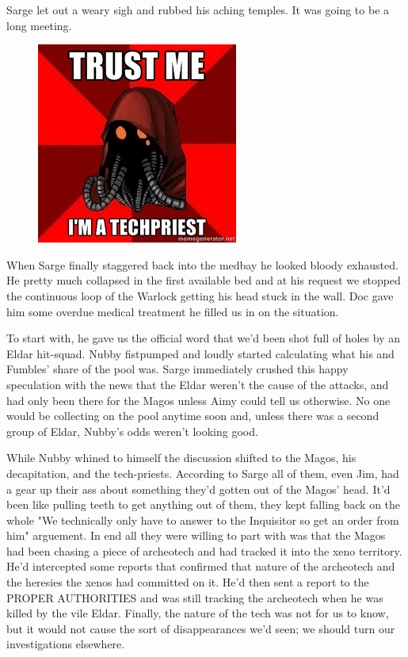 Sarge let out a weary sigh and rubbed his aching temples. 
It was going to be a long meeting.
\begin{figure}
	\begin{center}
		\includegraphics[width=\figwidth]{pics/11/35.png}
	\end{center}
\end{figure}
When Sarge finally staggered back into the medbay he looked bloody exhausted. 
He pretty much collapsed in the first available bed and at his request we stopped the continuous loop of the Warlock getting his head stuck in the wall. 
Doc gave him some overdue medical treatment he filled us in on the situation.

To start with, he gave us the official word that we'd been shot full of holes by an Eldar hit-squad. 
Nubby fistpumped and loudly started calculating what his and Fumbles' share of the pool was. 
Sarge immediately crushed this happy speculation with the news that the Eldar weren't the cause of the attacks, and had only been there for the Magos unless Aimy could tell us otherwise. 
No one would be collecting on the pool anytime soon and, unless there was a second group of Eldar, Nubby's odds weren't looking good.

While Nubby whined to himself the discussion shifted to the Magos, his decapitation, and the tech-priests. 
According to Sarge all of them, even Jim, had a gear up their ass about something they'd gotten out of the Magos' head. 
It'd been like pulling teeth to get anything out of them, they kept falling back on the whole "We technically only have to answer to the Inquisitor so get an order from him" arguement. 
In end all they were willing to part with was that the Magos had been chasing a piece of archeotech and had tracked it into the xeno territory. 
He'd intercepted some reports that confirmed that nature of the archeotech and the heresies the xenos had committed on it. 
He'd then sent a report to the PROPER AUTHORITIES and was still tracking the archeotech when he was killed by the vile Eldar. 
Finally, the nature of the tech was not for us to know, but it would not cause the sort of disappearances we'd seen; 
we should turn our investigations elsewhere.


